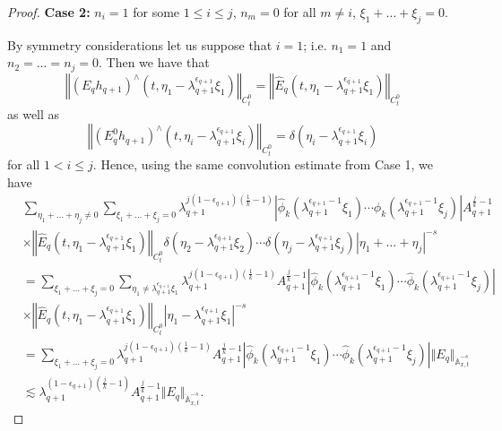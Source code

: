 \documentclass[12pt,reqno,letterpaper]{amsart}
\numberwithin{equation}{section}
\newcommand{\1}{{\bf 1}}
\newcommand{\2}{{\bf 2}}
\theoremstyle{remark}
\theoremstyle{remark}
\begin{document}
\begin{proof}
    \textbf{Case 2:} $n_i = 1$ for some $1 \leq i \leq j$, $n_m=0$ for all $m \not=i$, $\xi_1 + \ldots + \xi_j = 0$.

    By symmetry considerations let us suppose that $i = 1$; i.e. $n_1 = 1$ and $n_2=\ldots =n_j =0$. Then we have that
    $$
    \left\Vert \left(E_qh_{q+1}\right)^{\wedge}(t,\eta_1 - \lambda_{q+1}^{\epsilon_{q+1}} \xi_1)\right\Vert_{C_t^0} = \left\Vert \hat{E}_q(t,\eta_1 - \lambda_{q+1}^{\epsilon_{q+1}} \xi_1)\right\Vert_{C_t^0}
    $$
   as well as
   $$
   \left\Vert \left(E_q^{0} h_{q+1}\right)^{\wedge}(t,\eta_i - \lambda_{q+1}^{\epsilon_{q+1}} \xi_i) \right\Vert_{C_t^0} = \delta(\eta_i - \lambda_{q+1}^{\epsilon_{q+1}} \xi_i)
   $$
   for all $1 < i \leq j$. Hence, using the same convolution estimate from Case 1, we have
   \begin{equation}\label{eq:n=1_case}
       \begin{split}
           &\sum_{\eta_1 + \ldots + \eta_j \not=0} \sum_{\xi_1 + \ldots + \xi_j=0} \lambda_{q+1}^{j(1-\epsilon_{q+1})\left(\frac{1}{k} - 1\right)} \left|\hat{\phi}_k\left(\lambda_{q+1}^{\epsilon_{q+1}-1}\xi_1\right) \cdots \hat{\phi}_k\left(\lambda_{q+1}^{\epsilon_{q+1}-1}\xi_j\right)\right| A_{q+1}^{\frac{j}{k}-1}\\
           &\times \left\Vert \hat{E}_q(t,\eta_1 - \lambda_{q+1}^{\epsilon_{q+1}} \xi_1)\right\Vert_{C_t^0}\delta(\eta_2 - \lambda_{q+1}^{\epsilon_{q+1}} \xi_2) \cdots \delta(\eta_j - \lambda_{q+1}^{\epsilon_{q+1}} \xi_j) |\eta_1 + \ldots + \eta_j|^{-s}\\
           &= \sum_{\xi_1 + \ldots + \xi_j = 0}  \sum_{\eta_1 \not= \lambda_{q+1}^{\epsilon_{q+1}} \xi_1} \lambda_{q+1}^{j(1-\epsilon_{q+1})\left(\frac{1}{k}-1\right)}A_{q+1}^{\frac{j}{k}-1} \left|\hat{\phi}_k\left(\lambda_{q+1}^{\epsilon_{q+1}-1}\xi_1\right) \cdots \hat{\phi}_k\left(\lambda_{q+1}^{\epsilon_{q+1}-1}\xi_j\right)\right|\\
           &\times \left\Vert \hat{E}_q(t,\eta_1 - \lambda_{q+1}^{\epsilon_{q+1}} \xi_1)\right\Vert_{C_t^0} \left|\eta_1 -\lambda_{q+1}^{\epsilon_{q+1}} \xi_1\right|^{-s}\\
           &= \sum_{\xi_1 + \ldots + \xi_j = 0} \lambda_{q+1}^{j(1-\epsilon_{q+1})\left(\frac{1}{k}-1\right)} A_{q+1}^{\frac{j}{k}-1} \left|\hat{\phi}_k\left(\lambda_{q+1}^{\epsilon_{q+1}-1}\xi_1\right) \cdots \hat{\phi}_k\left(\lambda_{q+1}^{\epsilon_{q+1}-1}\xi_j\right)\right| \Vert E_q \Vert_{\dot{\mathbb{A}}_{x,t}^{-s}}\\
           &\lesssim \lambda_{q+1}^{(1-\epsilon_{q+1})\left(\frac{j}{k}-1\right)} A_{q+1}^{\frac{j}{k}-1} \Vert E_q \Vert_{\dot{\mathbb{A}}_{x,t}^{-s}}.
       \end{split}
   \end{equation}
    

\end{proof}
\end{document}
